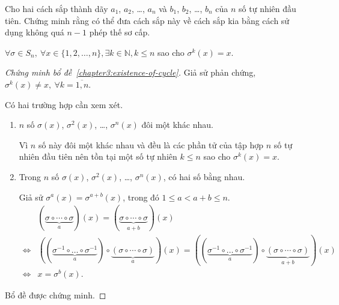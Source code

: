 \begin{exercise}
    Cho hai cách sắp thành dãy $a_{1}$, $a_{2}$, \ldots, $a_{n}$ và $b_{1}$, $b_{2}$, \ldots, $b_{n}$ của $n$ số tự nhiên đầu tiên. Chứng minh rằng có thể đưa cách sắp này về cách sắp kia bằng cách sử dụng không quá $n-1$ phép thế sơ cấp.
\end{exercise}

\begin{lemma}\label{chapter3:fixed-point}
    $\forall\sigma\in S_{n},\ \forall x\in\{ 1,2,\ldots,n \}, \exists k\in\mathbb{N}, k\le n$ sao cho $\sigma^{k}(x) = x$.
\end{lemma}

\begin{proof}[Chứng minh bổ đề~\ref{chapter3:existence-of-cycle}]
    
    Giả sử phản chứng, $\sigma^{k}(x)\ne x,\ \forall k=\overline{1,n}$.
    
    Có hai trường hợp cần xem xét.
    \begin{enumerate}[label = Trường hợp \arabic*:,itemindent=2cm]
        \item $n$ số $\sigma(x)$, $\sigma^{2}(x)$, \ldots, $\sigma^{n}(x)$ đôi một khác nhau.
              
              Vì $n$ số này đôi một khác nhau và đều là các phần tử của tập hợp $n$ số tự nhiên đầu tiên nên tồn tại một số tự nhiên $k\le n$ sao cho $\sigma^{k}(x) = x$.
        \item Trong $n$ số $\sigma(x)$, $\sigma^{2}(x)$, \ldots, $\sigma^{n}(x)$, có hai số bằng nhau.
              
              Giả sử $\sigma^{a}(x) = \sigma^{a+b}(x)$, trong đó $1\le a < a + b\le n$.
              \[
                  \begin{split}
                                      & (\underbrace{\sigma\circ\cdots\circ\sigma}_{a})(x) = (\underbrace{\sigma\circ\cdots\circ\sigma}_{a+b})(x)                                                                                                                                 \\
                      \Longleftrightarrow & ((\underbrace{\sigma^{-1}\circ\ldots\circ\sigma^{-1}}_{a})\circ\underbrace{(\sigma\circ\cdots\circ\sigma)}_{a})(x) = ((\underbrace{\sigma^{-1}\circ\ldots\circ\sigma^{-1}}_{a})\circ\underbrace{(\sigma\circ\cdots\circ\sigma)}_{a+b})(x) \\
                      \Longleftrightarrow & x = \sigma^{b}(x).
                  \end{split}
              \]
    \end{enumerate}
    
    Bổ đề được chứng minh.
\end{proof}

